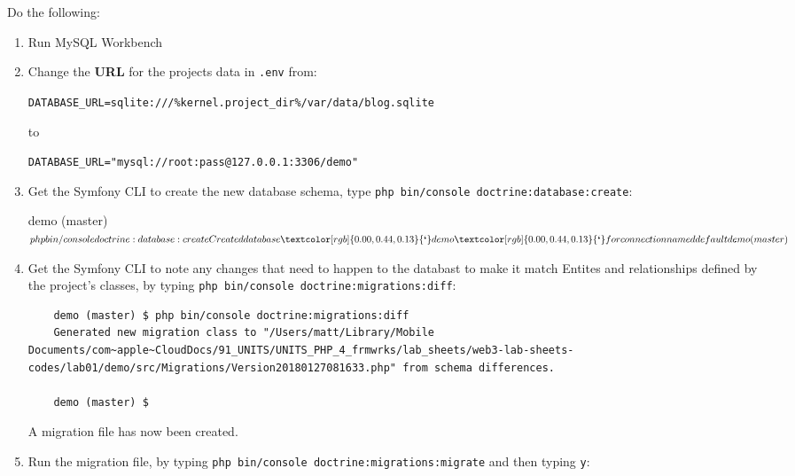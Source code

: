 \documentclass[a4paperpaper,openright]{book}
\newenvironment{Shaded}{}{}
\newcommand{\ExtensionTok}[1]{#1}
\newcommand{\KeywordTok}[1]{\textcolor[rgb]{0.00,0.44,0.13}{\textbf{#1}}}
\newcommand{\NormalTok}[1]{#1}
\begin{document}
Do the following:

\begin{enumerate}
\def\labelenumi{\arabic{enumi}.}
\item
  Run MySQL Workbench
\item
  Change the \textbf{URL} for the projects data in \texttt{.env} from:

  \texttt{DATABASE\_URL=sqlite:///\%kernel.project\_dir\%/var/data/blog.sqlite}

  to

  \texttt{DATABASE\_URL="mysql://root:pass@127.0.0.1:3306/demo"}
\item
  Get the Symfony CLI to create the new database schema, type
  \texttt{php\ bin/console\ doctrine:database:create}:

\begin{Shaded}
\begin{Highlighting}[]
    \ExtensionTok{demo}\NormalTok{ (master) $ }\ExtensionTok{php}\NormalTok{ bin/console doctrine:database:create}
    \ExtensionTok{Created}\NormalTok{ database }\KeywordTok{`}\ExtensionTok{demo}\KeywordTok{`}\NormalTok{ for connection named default}

    \ExtensionTok{demo}\NormalTok{ (master) $}
\end{Highlighting}
\end{Shaded}
\item
  Get the Symfony CLI to note any changes that need to happen to the
  databast to make it match Entites and relationships defined by the
  project's classes, by typing
  \texttt{php\ bin/console\ doctrine:migrations:diff}:

\begin{verbatim}
    demo (master) $ php bin/console doctrine:migrations:diff
    Generated new migration class to "/Users/matt/Library/Mobile Documents/com~apple~CloudDocs/91_UNITS/UNITS_PHP_4_frmwrks/lab_sheets/web3-lab-sheets-codes/lab01/demo/src/Migrations/Version20180127081633.php" from schema differences.

    demo (master) $
\end{verbatim}

  A migration file has now been created.
\item
  Run the migration file, by typing
  \texttt{php\ bin/console\ doctrine:migrations:migrate} and then typing
  \texttt{y}:

\begin{Shaded}
\end{Shaded}
\end{enumerate}
\end{document}
